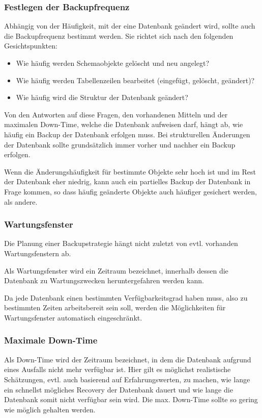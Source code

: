         \subsubsection{Festlegen der Backupfrequenz}
          Abhängig von der Häufigkeit, mit der eine Datenbank geändert wird, sollte auch die Backupfrequenz bestimmt werden. Sie richtet sich nach den folgenden Gesichtspunkten:
          \begin{itemize}
            \item Wie häufig werden Schemaobjekte gelöscht und neu angelegt?
            \item Wie häufig werden Tabellenzeilen bearbeitet (eingefügt, gelöscht, geändert)?
            \item Wie häufig wird die Struktur der Datenbank geändert?
          \end{itemize}
          Von den Antworten auf diese Fragen, den vorhandenen Mitteln und der maximalen Down-Time, welche die Datenbank aufweisen darf, hängt ab, wie häufig ein Backup der Datenbank erfolgen muss. Bei strukturellen Änderungen der Datenbank sollte grundsätzlich immer vorher und nachher ein Backup erfolgen.

          Wenn die Änderungshäufigkeit für bestimmte Objekte sehr hoch ist und im Rest der Datenbank eher niedrig, kann auch ein partielles Backup der Datenbank in Frage kommen, so dass häufig geänderte Objekte auch häufiger gesichert werden, als andere.
        \subsubsection{Wartungsfenster}
          Die Planung einer Backupstrategie hängt nicht zuletzt von evtl. vorhanden Wartungsfenstern ab.
          \begin{merke}
            Als Wartungsfenster wird ein Zeitraum bezeichnet, innerhalb dessen die Datenbank zu Wartungszwecken heruntergefahren werden kann.
          \end{merke}
          Da jede Datenbank einen bestimmten Verfügbarkeitsgrad haben muss, also zu bestimmten Zeiten arbeitsbereit sein soll, werden die Möglichkeiten für Wartungsfenster automatisch eingeschränkt.
        \subsubsection{Maximale Down-Time}
          \begin{merke}
            Als Down-Time wird der Zeitraum bezeichnet, in dem die Datenbank aufgrund eines Ausfalls nicht mehr verfügbar ist. Hier gilt es möglichst realistische Schätzungen, evtl. auch basierend auf Erfahrungswerten, zu machen, wie lange ein schnellst mögliches Recovery der Datenbank dauert und wie lange die Datenbank somit nicht verfügbar sein wird. Die max. Down-Time sollte so gering wie möglich gehalten werden.
          \end{merke}

